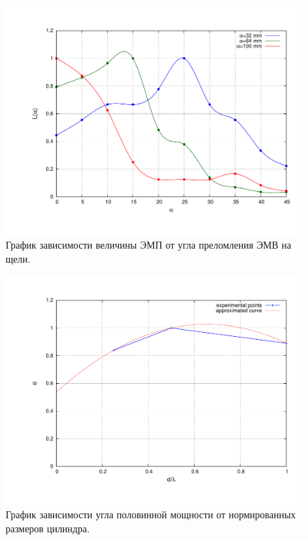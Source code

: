 \documentclass[12pt,a4paper,oneside, reqno]{amsart}
\begin{document}
\begin{figure}
    \centering
    \includegraphics[width = \textwidth]{plot3.pdf}
    \vspace{-30pt}
    \caption{График зависимости величины ЭМП от угла преломления ЭМВ на щели.}
    \label{fig:plot3}
\end{figure}

\begin{figure}
    \centering
    \includegraphics[width = \textwidth]{plot4-1.pdf}
    \vspace{-30pt}
    \caption{График зависимости угла половинной мощности от нормированных размеров цилиндра.}
    \label{fig:plot4}
\end{figure}
\end{document}
